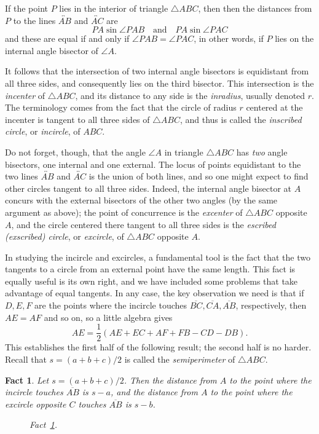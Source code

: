 \documentclass[12pt]{book}
\newcounter{exc}
\numberwithin{exc}{section}
\numberwithin{figure}{section}
\newtheorem{fact}[theorem]{Fact}
\numberwithin{equation}{theorem}
\def\line#1{\overleftrightarrow{#1}}
\def\seg#1{\overline{#1}}
\begin{document}
If the point $P$ lies in the interior of triangle $\triangle ABC$,
then then the distances from $P$ 
to the lines $\line{AB}$ and $\line{AC}$ are
\[
PA \sin \angle PAB \quad \mbox{and} \quad PA \sin \angle PAC
\]
and these are equal if and only if $\angle PAB = \angle PAC$, in 
other words, if $P$ lies on the internal angle bisector of $\angle A$.

It follows that the intersection of two internal angle 
bisectors is equidistant from all three sides, and consequently lies 
on the third bisector. This intersection is the \emph{incenter} 
 of 
$\triangle ABC$, 
and its distance to any side is the \emph{inradius}, 
 usually 
denoted $r$. The terminology comes from the fact that the circle of 
radius $r$ centered at the incenter is tangent to all three sides of 
$\triangle ABC$, and thus is called the \emph{inscribed circle}, 
or 
\emph{incircle},  of $ABC$.

Do not forget, though, that the angle $\angle A$ in triangle $\triangle ABC$ 
has \emph{two} 
angle bisectors, one internal and one external. The locus of points 
equidistant to the two lines $\line{AB}$ and $\line{AC}$ is the union of both 
lines, and so one might expect to find other circles tangent to all 
three sides. Indeed, the internal angle bisector at $A$ concurs with 
the external bisectors of the other two angles (by the same argument 
as above); the point of concurrence is the \emph{excenter} 
 of $\triangle ABC$ opposite 
$A$, and the circle centered there tangent to all three sides is the 
\emph{escribed (exscribed) circle}, 
or \emph{excircle},  of
$\triangle ABC$ opposite $A$.

In studying the incircle and excircles, a fundamental tool is the fact that 
the two tangents to a circle from an external point have the same 
length. This fact is equally useful is its own right, and we have 
included some problems that take advantage of equal tangents. In any 
case, the key observation we need is that if $D,E,F$ are the points 
where the incircle touches $\seg{BC}, \seg{CA}, \seg{AB}$, 
respectively, then $AE = AF$ 
and so on, so a little algebra gives
\[
AE = \frac{1}{2}(AE + EC + AF + FB - CD - DB).
\]
This establishes the first half of the following result; the second 
half is no harder.
Recall that $s = (a+b+c)/2$ is called the \emph{semiperimeter} 
 of $\triangle ABC$.
\begin{fact} \label{fact:incircle}
Let $s = (a+b+c)/2$. Then the distance from $A$ to the point where the 
incircle touches $\seg{AB}$ is $s-a$, and the distance from $A$ to the point 
where the excircle opposite $C$ touches $\seg{AB}$ is $s-b$. 
\begin{figure}[ht]
\caption{Fact~\ref{fact:incircle}.}
\end{figure}
\end{fact}
\end{document}
